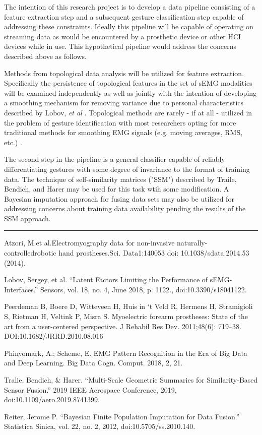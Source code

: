 \documentclass[11pt]{article}
\begin{document}
The intention of this research project is to develop a data pipeline consisting of a feature extraction step and a subsequent gesture classification step capable of addressing these constraints. Ideally this pipeline will be capable of operating on streaming data as would be encountered by a prosthetic device or other HCI devices while in use. This hypothetical pipeline would address the concerns described above as follows.

Methods from topological data analysis will be utilized for feature extraction. Specifically the persistence of topological features in the set of sEMG modalities will be examined independently as well as jointly with the intention of developing a smoothing mechanism for removing variance due to personal characteristics described by Lobov, \emph{et al} \cite{lobov}. Topological methods are rarely - if at all - utilized in the problem of gesture identification with most researchers opting for more traditional methods for smoothing EMG signals (e.g. moving averages, RMS, etc.) \cite{state}.

The second step in the pipeline is a general classifier capable of reliably differentiating gestures with some degree of invariance to the format of training data. The technique of self-similarity matrices ("SSM") described by Traile, Bendich, and Harer may be used for this task wtih some modification\cite{ssm}. A Bayesian imputation approach for fusing data sets \cite{bayesfuse} may also be utilized for addressing concerns about training data availability pending the results of the SSM approach.

\begin{center}
\noindent\rule{16cm}{0.4pt}
\end{center}


\begin{thebibliography}{5}

 Atzori, M.et al.Electromyography data for non-invasive naturally-controlledrobotic hand prostheses.Sci. Data1:140053 doi: 10.1038/sdata.2014.53 (2014).

 Lobov, Sergey, et al. “Latent Factors Limiting the Performance of sEMG-Interfaces.” Sensors, vol. 18, no. 4, June 2018, p. 1122., doi:10.3390/s18041122.

 Peerdeman  B,  Boere  D,  Witteveen  H,  Huis  in  ‘t  Veld  R,  Hermens H, Stramigioli S, Rietman H, Veltink P, Misra S. Myoelectric  forearm  prostheses:  State  of  the  art  from  a  user-centered perspective. J Rehabil Res Dev. 2011;48(6): 719–38. DOI:10.1682/JRRD.2010.08.016

 Phinyomark, A.; Scheme, E. EMG Pattern Recognition in the Era of Big Data and Deep Learning. Big Data Cogn. Comput. 2018, 2, 21. 

 Tralie, Bendich, \& Harer. “Multi-Scale Geometric Summaries for Similarity-Based Sensor Fusion.” 2019 IEEE Aerospace Conference, 2019, doi:10.1109/aero.2019.8741399.

 Reiter, Jerome P. “Bayesian Finite Population Imputation for Data Fusion.” Statistica Sinica, vol. 22, no. 2, 2012, doi:10.5705/ss.2010.140.

\end{thebibliography}
  
\end{document}
